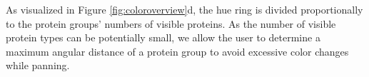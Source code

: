 \documentclass{egpubl}
\begin{document}
%	
%	
%	

	As visualized in Figure \ref{fig:coloroverview}d, the hue ring is divided proportionally to the protein groups' numbers of visible proteins. 
	As the number of visible protein types can be potentially small, we allow the user to determine a maximum angular distance of a protein group to avoid excessive color changes while panning. 
	
	
\end{document}
